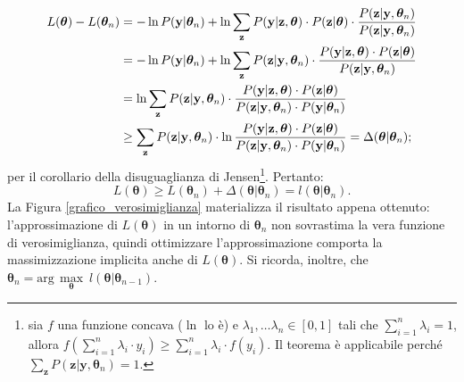 \begin{equation}
	\begin{split}
		L(\boldsymbol{\theta}) - L(\boldsymbol{\theta}_n) & = -\ln P(\mathbf{y}|\boldsymbol{\theta}_n) + \ln\sum_{\mathbf{z}}^{} P(\mathbf{y}|\mathbf{z},\boldsymbol{\theta})\cdot P(\mathbf{z}|\boldsymbol{\theta})\cdot\frac{\textcolor{black}{P(\mathbf{z}|\mathbf{y},\boldsymbol{\theta}_n)}}{\textcolor{black}{P(\mathbf{z}|\mathbf{y},\boldsymbol{\theta}_n)}} \\
		& = \textcolor{black}{-\ln P(\mathbf{y}|\boldsymbol{\theta}_n)} + \ln\sum_{\mathbf{z}}^{} \textcolor{black}{P(\mathbf{z}|\mathbf{y},\boldsymbol{\theta}_n)}\cdot\frac{P(\mathbf{y}|\mathbf{z},\boldsymbol{\theta})\cdot P(\mathbf{z}|\boldsymbol{\theta})}{\textcolor{black}{P(\mathbf{z}|\mathbf{y},\boldsymbol{\theta}_n)}} \\
		& = \ln\sum_{\mathbf{z}}^{} \textcolor{black}{P(\mathbf{z}|\mathbf{y},\boldsymbol{\theta}_n)}\cdot\frac{P(\mathbf{y}|\mathbf{z},\boldsymbol{\theta})\cdot P(\mathbf{z}|\boldsymbol{\theta})}{\textcolor{black}{P(\mathbf{z}|\mathbf{y},\boldsymbol{\theta}_n)}\cdot\textcolor{black}{ P(\mathbf{y}|\boldsymbol{\theta}_n)}} \\
		& \geq\sum_{\mathbf{z}}^{}\textcolor{black}{P(\mathbf{z}|\mathbf{y},\boldsymbol{\theta}_n)}\cdot\ln\frac{P(\mathbf{y}|\mathbf{z},\boldsymbol{\theta})\cdot P(\mathbf{z}|\boldsymbol{\theta})}{\textcolor{black}{P(\mathbf{z}|\mathbf{y},\boldsymbol{\theta}_n)}\cdot P(\mathbf{y}|\boldsymbol{\theta}_n)} =\Delta(\boldsymbol{\theta}|\boldsymbol{\theta}_n);
	\end{split}
\end{equation}
per il corollario della disuguaglianza di Jensen\footnote{sia $f$ una funzione concava ($\ln$ lo è) e $\lambda_1,\dots\lambda_n\in [0,1]$ tali che $\sum_{i=1}^{n}\lambda_i = 1$, allora $f(\sum_{i=1}^{n}\lambda_i\cdot y_i)\geq\sum_{i=1}^{n}\lambda_i\cdot f(y_i)$. Il teorema è applicabile perché $\sum_{\mathbf{z}}^{} P(\mathbf{z}|\mathbf{y},\boldsymbol{\theta}_n)=1$.}. Pertanto:
\begin{equation}
	L(\boldsymbol{\theta})\geq L(\boldsymbol{\theta}_n)+\Delta(\boldsymbol{\theta}|\boldsymbol{\theta}_n)= l(\boldsymbol{\theta}|\boldsymbol{\theta}_n).
\end{equation}
La Figura \ref{grafico_verosimiglianza} materializza il risultato appena ottenuto: l'approssimazione di $L(\boldsymbol{\theta})$ in un intorno di $\boldsymbol{\theta}_n$ non sovrastima la vera funzione di verosimiglianza, quindi ottimizzare l'approssimazione comporta la massimizzazione implicita anche di $L(\boldsymbol{\theta})$. Si ricorda, inoltre, che $\boldsymbol{\theta}_n = \text{arg}\,\max\limits_{\boldsymbol{\theta}} \ l(\boldsymbol{\theta}|\boldsymbol{\theta}_{n-1})$.


